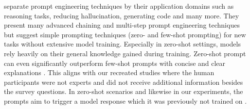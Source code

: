 \par \textcite{sahoo2024systematic} separate prompt engineering techniques by their application domains such as reasoning tasks, reducing hallucination, generating code and many more. They present many advanced chaining and multi-step prompt engineering techniques but suggest simple prompting techniques (zero- and few-shot prompting) for new tasks without extensive model training. Especially in zero-shot settings, models rely heavily on their general knowledge gained during training. Zero-shot prompt can even significantly outperform few-shot prompts with concise and clear explanations \parencite{chen2023unleashing,ekin2023prompt}. This aligns with our recreated studies where the human participants were not experts and did not receive additional information besides the survey questions. In zero-shot scenarios and likewise in our experiments, the prompts aim to trigger a model response which it was previously not trained on \parencite{marvin2023prompt}.

